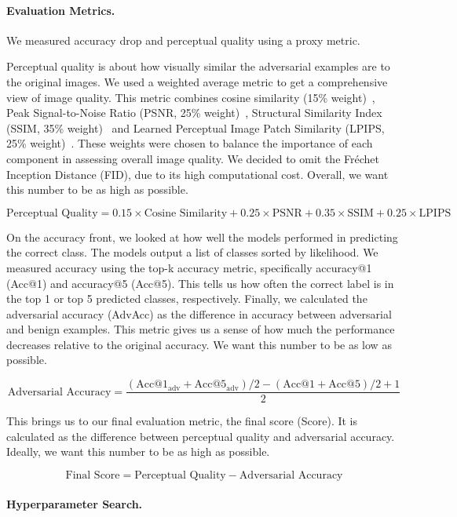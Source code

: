 \documentclass[a4paper, oneside]{discothesis}
\begin{document}
\paragraph{Evaluation Metrics.}

We measured accuracy drop and perceptual quality using a proxy metric.

Perceptual quality is about how visually similar the adversarial examples are to the original images. We used a weighted average metric to get a comprehensive view of image quality. This metric combines cosine similarity (15\% weight)~\cite{singhal2001modern}, Peak Signal-to-Noise Ratio (PSNR, 25\% weight)~\cite{9311108}, Structural Similarity Index (SSIM, 35\% weight)~\cite{wang2004image} and Learned Perceptual Image Patch Similarity (LPIPS, 25\% weight)~\cite{lpips}. These weights were chosen to balance the importance of each component in assessing overall image quality. We decided to omit the Fréchet Inception Distance (FID), due to its high computational cost. Overall, we want this number to be as high as possible.

$$
\text{Perceptual Quality} = 0.15 \times \text{Cosine Similarity} + 0.25 \times \text{PSNR} + 0.35 \times \text{SSIM} + 0.25 \times \text{LPIPS}
$$

On the accuracy front, we looked at how well the models performed in predicting the correct class. The models output a list of classes sorted by likelihood. We measured accuracy using the top-k accuracy metric, specifically accuracy@1 (Acc@1) and accuracy@5 (Acc@5). This tells us how often the correct label is in the top 1 or top 5 predicted classes, respectively. Finally, we calculated the adversarial accuracy (AdvAcc) as the difference in accuracy between adversarial and benign examples. This metric gives us a sense of how much the performance decreases relative to the original accuracy. We want this number to be as low as possible.

$$
\text{Adversarial Accuracy} = \frac{(\text{Acc@1}_{\text{adv}} + \text{Acc@5}_{\text{adv}}) / 2 - (\text{Acc@1} + \text{Acc@5}) / 2 + 1}{2}
$$

This brings us to our final evaluation metric, the final score (Score). It is calculated as the difference between perceptual quality and adversarial accuracy. Ideally, we want this number to be as high as possible.

$$
\text{Final Score} = \text{Perceptual Quality} - \text{Adversarial Accuracy}
$$

\paragraph{Hyperparameter Search.}
\end{document}
